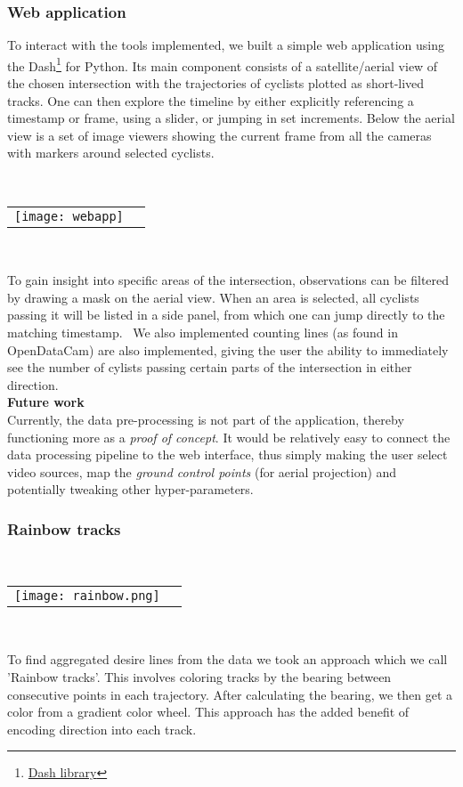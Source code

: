 \subsubsection{Web application}
To interact with the tools implemented, we built a simple web application using the Dash\footnote{\href{https://plotly.com/dash/}{Dash library}} for Python. 
Its main component consists of a satellite/aerial view of the chosen intersection with the trajectories of cyclists plotted as short-lived tracks. 
One can then explore the timeline by either explicitly referencing a timestamp or frame, using a slider, or jumping in set increments.
Below the aerial view is a set of image viewers showing the current frame from all the cameras with markers around selected cyclists.

\ \\ 
\raggedbottom
\begin{tabular}{@{}cc}
\texttt{[image: webapp]} 
\end{tabular}
\label{webapp}
\

To gain insight into specific areas of the intersection, observations can be filtered by drawing a mask on the aerial view. 
When an area is selected, all cyclists passing it will be listed in a side panel, from which one can jump directly to the matching timestamp.
\
We also implemented counting lines (as found in OpenDataCam) are also implemented, giving the user the ability to immediately see the number of 
cylists passing certain parts of the intersection in either direction.
\ \\

\textbf{Future work} \\
Currently, the data pre-processing is not part of the application, thereby functioning more as a \textit{proof of concept}.
It would be relatively easy to connect the data processing pipeline to the web interface, thus simply making the user 
select video sources, map the \textit{ground control points} (for aerial projection) and potentially tweaking other hyper-parameters. 

\subsubsection{Rainbow tracks}

\ \\ 
\noindent
\begin{tabular}{@{}cc}
\texttt{[image: rainbow.png]} 
\end{tabular}
\label{Rainbow}
\

To find aggregated desire lines from the data we took an approach which we call 'Rainbow tracks'. 
This involves coloring tracks by the bearing between consecutive points in each trajectory. 
After calculating the bearing, we then get a color from a gradient color wheel. 
This approach has the added benefit of encoding direction into each track.
\ \\ 


